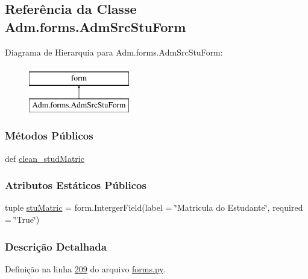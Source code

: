 \hypertarget{classAdm_1_1forms_1_1AdmSrcStuForm}{\subsection{Referência da Classe Adm.\-forms.\-Adm\-Src\-Stu\-Form}
\label{classAdm_1_1forms_1_1AdmSrcStuForm}
}
Diagrama de Hierarquia para Adm.\-forms.\-Adm\-Src\-Stu\-Form\-:\begin{figure}[H]
\begin{center}
\leavevmode
\includegraphics[height=2.000000cm]{d7/d61/classAdm_1_1forms_1_1AdmSrcStuForm}
\end{center}
\end{figure}
\subsubsection*{Métodos Públicos}
\begin{DoxyCompactItemize}
\item 
def \hyperlink{classAdm_1_1forms_1_1AdmSrcStuForm_a59bb6673b9d60df71065b72d1395200e}{clean\-\_\-stud\-Matric}
\end{DoxyCompactItemize}
\subsubsection*{Atributos Estáticos Públicos}
\begin{DoxyCompactItemize}
\item 
tuple \hyperlink{classAdm_1_1forms_1_1AdmSrcStuForm_a0229d190c71b996fea62f558235bd588}{stu\-Matric} = form.\-Interger\-Field(label = \char`\"{}Matricula do Estudante\char`\"{}, required = \char`\"{}True\char`\"{})
\end{DoxyCompactItemize}


\subsubsection{Descrição Detalhada}


Definição na linha \hyperlink{Adm_2forms_8py_source_l00209}{209} do arquivo \hyperlink{Adm_2forms_8py_source}{forms.\-py}.



